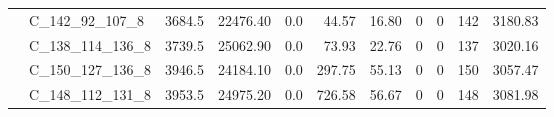 \begin{tabular}{llrrrrrrrrr}
      & C\_142\_92\_107\_8 &  3684.5 &  22476.40 &  0.0 &   44.57 &    16.80 &    0 &    0 &         142 &  3180.83 \\
      & C\_138\_114\_136\_8 &  3739.5 &  25062.90 &  0.0 &   73.93 &    22.76 &    0 &    0 &         137 &  3020.16 \\
      & C\_150\_127\_136\_8 &  3946.5 &  24184.10 &  0.0 &  297.75 &    55.13 &    0 &    0 &         150 &  3057.47 \\
      & C\_148\_112\_131\_8 &  3953.5 &  24975.20 &  0.0 &  726.58 &    56.67 &    0 &    0 &         148 &  3081.98 \\
\bottomrule
\end{tabular}

